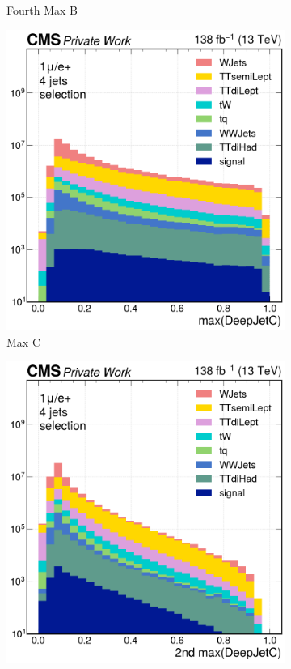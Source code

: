 \begin{figure}[H]
\begin{subfigure}{0.42\linewidth}
         \caption{Fourth Max \DeepJet B}
     \end{subfigure}
          \begin{subfigure}{0.42\linewidth}
         \includegraphics[width=\linewidth]{fig//chap07-selection/btag/Max_DeepJetC.png}
         \caption{Max \DeepJet C}
     \end{subfigure}
    \begin{subfigure}{0.42\linewidth}
         \includegraphics[width=\linewidth]{fig//chap07-selection/btag/Second_Max_DeepJetC.png}

\end{subfigure}
\end{figure}
